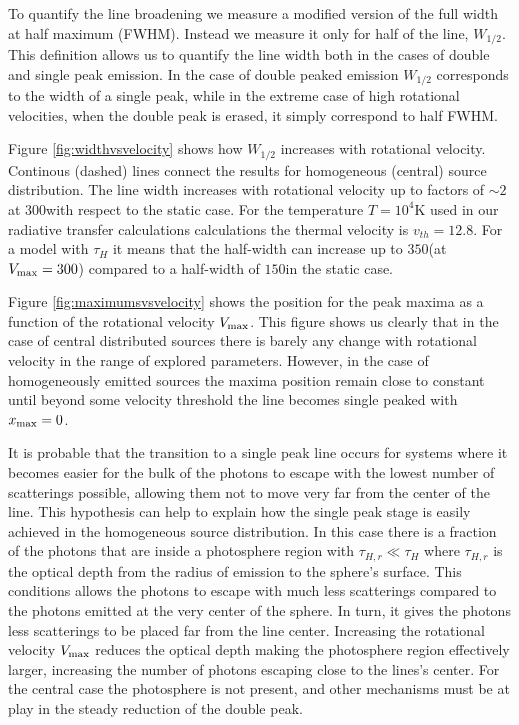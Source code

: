 \documentclass[usenatbib]{mn2e}
\newcommand{\kms}{{\ifmmode{{\mathrm{\,km\ s}^{-1}}}\else{\,km~s$^{-1}$}\fi}}
\begin{document}
To quantify the line broadening we measure a modified version of the full
width at half maximum (FWHM). Instead we measure it only for half of
the line, $W_{1/2}$. This definition allows us to quantify the line
width both in the cases of double and single peak emission.  In the
case of double peaked emission $W_{1/2}$ corresponds to the width of a
single peak, while in the extreme case of high rotational velocities,
when the double peak is erased, it simply correspond to half FWHM.  

Figure \ref{fig:widthvsvelocity} shows how $W_{1/2}$ increases with
rotational velocity. Continous (dashed) lines connect the results for
homogeneous (central) source distribution. The line width increases
with rotational velocity up to factors of $\sim 2$ at $300$\kms with
respect to the static case. For the temperature $T=10^4$K used in our
radiative transfer calculations calculations the thermal velocity is
$v_{th}=12.8$\kms. For a model with $\tau_{H}$ it means that the
half-width can increase up to $350$\kms (at $V_{\rm max}=300$\kms)
compared to a half-width of $150$\kms in the static case.  




Figure \ref{fig:maximumsvsvelocity} shows the position for the peak
maxima as a function of the rotational velocity $V_{\rm max}$. This
figure shows us clearly that in the case of central distributed
sources there is barely any change with rotational velocity in the
range of explored parameters. However, in the case of
homogeneously emitted sources the maxima position remain close to
constant until beyond some velocity threshold the line becomes single
peaked with $x_{\rm max}=0$. 

It is probable that the transition to a single peak line occurs for systems
where it  becomes easier for the bulk of the photons to escape with the lowest
number of scatterings possible, allowing them not to move very far
from the center of the line. This hypothesis can help to explain how the
single peak stage is easily achieved in the homogeneous source
distribution. In this case there is a fraction of the photons that are
inside a photosphere region with $\tau_{H,r}\ll \tau_{H}$ where
$\tau_{H,r}$ is the optical depth from the radius of emission to the
sphere's surface. This conditions allows the photons to escape with
much less scatterings compared to the photons emitted at the very
center of the sphere. In turn, it gives the photons less scatterings
to be placed far from the line center. Increasing the rotational
velocity $V_{\rm max}$ reduces the optical depth making the
photosphere region effectively larger, increasing the number of
photons escaping close to the lines's center. For the central case the
photosphere is not present, and other mechanisms must be at play in
the steady reduction of the double peak. 
\end{document}
